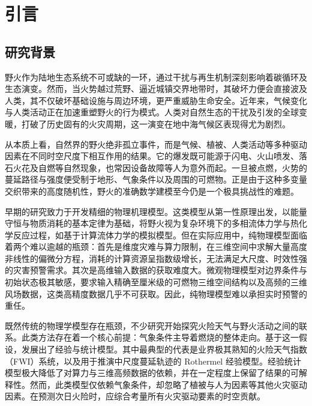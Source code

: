 \chapter{引言}
\label{chap:introduction}

\section{研究背景}
\label{sec:1-research-background}
野火作为陆地生态系统不可或缺的一环，通过干扰与再生机制深刻影响着碳循环及生态演变\cite{pausas2017flammability}。然而，当火势越过荒野、逼近城镇交界地带时，其破坏力便会直接波及人类，其不仅破坏基础设施与周边环境，更严重威胁生命安全。近年来，气候变化与人类活动正在加速重塑野火的行为模式\cite{pausas2021wildfires}。人类对自然生态的干扰及引发的全球变暖，打破了历史固有的火灾周期，这一演变在地中海气候区表现得尤为剧烈\cite{batllori2013climate,moreira2020wildfire}。

从本质上看，自然界的野火绝非孤立事件，而是气候、植被、人类活动等多种驱动因素在不同时空尺度下相互作用的结果\cite{archibald2013defining}。它的爆发既可能源于闪电、火山喷发、落石火花及自燃等自然现象，也常因设备故障等人为意外而起。一旦被点燃，火势的蔓延路径与强度便受制于地形、气象条件以及周围的可燃物。正是由于这种多变量交织带来的高度随机性，野火的准确数学建模至今仍是一个极具挑战性的难题。

早期的研究致力于开发精细的物理机理模型。这类模型从第一性原理出发，以能量守恒与物质消耗的基本定律为基础，将野火视为复杂环境下的多相流体力学与热化学反应过程，如基于计算流体力学的模拟模型\cite{linn2002studying,mell2007physics}。但在实际应用中，纯物理模型面临着两个难以逾越的瓶颈：首先是维度灾难与算力限制，在三维空间中求解大量高度非线性的偏微分方程，消耗的计算资源呈指数级增长，无法满足大尺度、时效性强的灾害预警需求。其次是高维输入数据的获取难度大。微观物理模型对边界条件与初始状态极其敏感，要求输入精确至厘米级的可燃物三维空间结构以及高频的三维风场数据，这类高精度数据几乎不可获取。因此，纯物理模型难以承担实时预警的重任。

既然传统的物理学模型存在瓶颈，不少研究开始探究火险天气与野火活动之间的联系。此类方法存在着一个核心前提：气象条件主导着燃烧的整体走向\cite{abatzoglou2019global,wildfire-review}。基于这一假设，发展出了经验与统计模型。其中最典型的代表是业界极其熟知的火险天气指数（FWI）系统\cite{van1974structure}，以及用于推演中尺度蔓延轨迹的 Rothermel 经验模型\cite{rothermel1972mathematical}。经验统计模型极大降低了对算力与三维高频数据的依赖，并在一定程度上保留了结果的可解释性。然而，此类模型仅依赖气象条件，却忽略了植被与人为因素等其他火灾驱动因素。在预测次日火险时，应综合考量所有火灾驱动要素的时空贡献。


